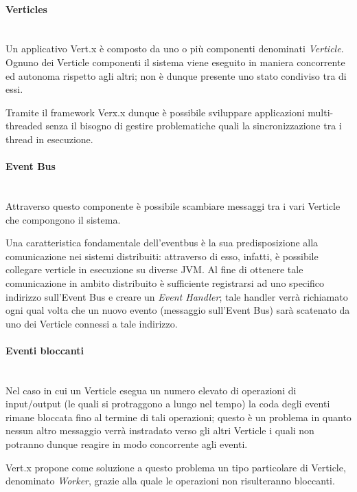 \paragraph{Verticles}\mbox{}\\
Un applicativo Vert.x è composto da uno o più componenti denominati \emph{Verticle}.\newline
Ognuno dei Verticle componenti il sistema viene eseguito in maniera
concorrente ed autonoma rispetto agli altri; non è dunque presente uno stato condiviso tra di essi.\newline

\noindent Tramite il framework Verx.x dunque è possibile sviluppare applicazioni multi-threaded senza il bisogno di gestire problematiche quali la sincronizzazione tra i thread in esecuzione.

\paragraph{Event Bus}\mbox{}\\
Attraverso questo componente è possibile scambiare messaggi tra i vari Verticle che compongono il sistema.\newline

\noindent Una caratteristica fondamentale dell'eventbus è la sua predisposizione alla comunicazione nei sistemi distribuiti: attraverso di esso, infatti, è possibile collegare verticle in esecuzione su diverse JVM.\newline
Al fine di ottenere tale comunicazione in ambito distribuito è sufficiente registrarsi ad uno specifico indirizzo sull'Event Bus e creare un \emph{Event Handler}; tale handler verrà richiamato ogni qual volta che un nuovo evento (messaggio sull'Event Bus) sarà scatenato da uno dei Verticle connessi a tale indirizzo.

\paragraph{Eventi bloccanti}\mbox{}\\
Nel caso in cui un Verticle esegua un numero elevato di operazioni di input/output (le quali si protraggono a lungo nel tempo) la coda degli eventi rimane bloccata fino al termine di tali operazioni; questo è un problema in quanto nessun altro messaggio verrà instradato verso gli altri Verticle i quali non potranno dunque reagire in modo concorrente agli eventi.\newline

\noindent Vert.x propone come soluzione a questo problema un tipo particolare di Verticle, denominato \emph{Worker}, grazie alla quale le operazioni non risulteranno bloccanti.

